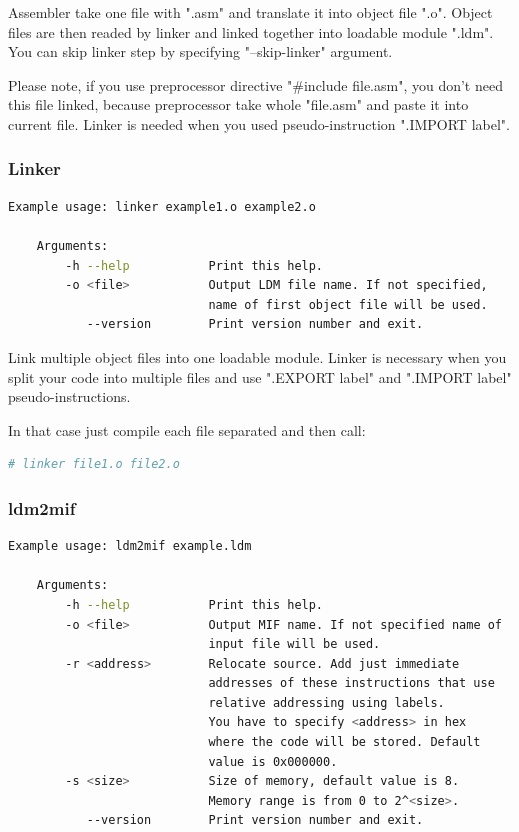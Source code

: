 Assembler take one file with ".asm" and translate it into object file ".o".
Object files are then readed by linker and linked together into loadable module
".ldm". You can skip linker step by specifying "--skip-linker" argument.

Please note, if you use preprocessor directive "\#include file.asm", you don't
need this file linked, because preprocessor take whole "file.asm" and paste it
into current file. Linker is needed when you used pseudo-instruction ".IMPORT
label".

\subsubsection{Linker}

\begin{lstlisting}[language=bash, frame=single]
    Example usage: linker example1.o example2.o

    Arguments:
        -h --help           Print this help.
        -o <file>           Output LDM file name. If not specified,
                            name of first object file will be used.
           --version        Print version number and exit.
\end{lstlisting}

Link multiple object files into one loadable module. Linker is necessary when
you split your code into multiple files and use ".EXPORT label" and ".IMPORT
label" pseudo-instructions.

In that case just compile each file separated and then call:

\begin{lstlisting}[language=bash, frame=single]
    # linker file1.o file2.o
\end{lstlisting}

\subsubsection{ldm2mif}

\begin{lstlisting}[language=bash, frame=single]
    Example usage: ldm2mif example.ldm

    Arguments:
        -h --help           Print this help.
        -o <file>           Output MIF name. If not specified name of
                            input file will be used.
        -r <address>        Relocate source. Add just immediate
                            addresses of these instructions that use
                            relative addressing using labels.
                            You have to specify <address> in hex
                            where the code will be stored. Default
                            value is 0x000000.
        -s <size>           Size of memory, default value is 8.
                            Memory range is from 0 to 2^<size>.
           --version        Print version number and exit.
\end{lstlisting}

